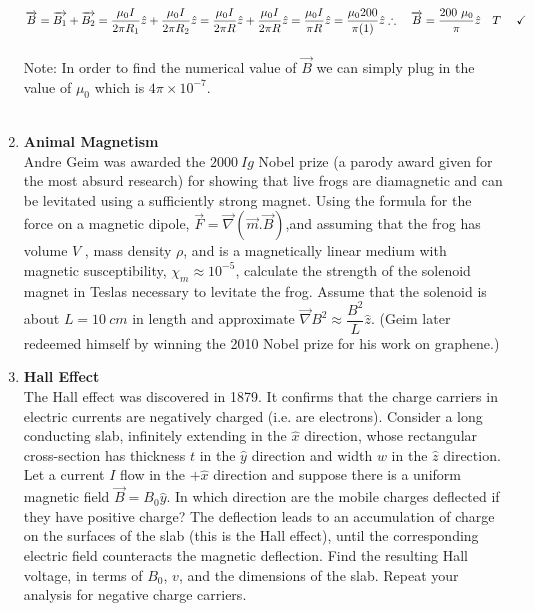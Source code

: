 \documentclass[fleqn]{article}
\begin{document}
\begin{enumerate}
{        $
          \overrightarrow{B}=\overrightarrow{B_1}+\overrightarrow{B_2}
          =\dfrac{\mu_0 I}{2 \pi R_1} \hat{z}+\dfrac{\mu_0 I}{2 \pi R_2} \hat{z}
          =\dfrac{\mu_0 I}{2 \pi R} \hat{z}+\dfrac{\mu_0 I}{2 \pi R} \hat{z}
          =\dfrac{\mu_0 I}{\pi R} \hat{z}
          =\dfrac{\mu_0 200}{\pi (1)} \hat{z}
          \\
          \\
          \\
          \therefore ~~~ \overrightarrow{B}=\dfrac{200 ~ \mu_0}{\pi} \hat{z} ~~~ T ~~~~ \checkmark
        $
        \\
        \\
        Note: In order to find the numerical value of $\overrightarrow{B}$ we can simply plug in the value of $\mu_0$ which is 
        $4 \pi \times 10^{-7}$. 
        \\
        \\
      }

    \item \textbf{Animal Magnetism}
    \\
    Andre Geim was awarded the $2000 ~ Ig$ Nobel prize (a parody award given for the most absurd research) for showing that live frogs are
    diamagnetic and can be levitated using a sufficiently strong magnet. Using the formula for the force on a magnetic dipole, 
    $\overrightarrow{F}=\overrightarrow{\nabla} \left(
      \overrightarrow{m}.\overrightarrow{B}
    \right)$,and assuming that the frog has volume $V$ , mass density $\rho$, and is a magnetically linear medium with 
    magnetic susceptibility, $\chi_m \approx 10^{-5}$, calculate the strength of the solenoid magnet in Teslas necessary to
    levitate the frog. Assume that the solenoid is about $L=10 ~ cm$ in
    length and approximate $\overrightarrow{\nabla} B^2 \approx \dfrac{B^2}{L} \hat{z}$. (Geim later redeemed himself
    by winning the 2010 Nobel prize for his work on graphene.)


    \item \textbf{Hall Effect}
    \\
    The Hall effect was discovered in 1879. It confirms that the charge carriers in electric currents are negatively charged (i.e. are electrons).
    Consider a long conducting slab, infinitely extending in the $\hat{x}$ direction, whose rectangular cross-section has thickness $t$ in 
    the $\hat{y}$ direction and width $w$ in the $\hat{z}$ direction. Let a current $I$ flow in the $+\hat{x}$ direction
    and suppose there is a uniform magnetic field $\overrightarrow{B}=B_0 \hat{y}$. In which direction are the mobile charges deflected if they 
    have positive charge? The deflection leads to an accumulation of charge on the surfaces of the slab (this is the Hall effect), until the 
    corresponding electric field counteracts the magnetic deflection. Find the resulting Hall voltage, in terms of $B_0$, $v$, and the dimensions
    of the slab. Repeat your analysis for negative charge carriers.


\end{enumerate}
\end{document}
